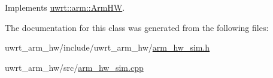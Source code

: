 Implements \hyperlink{classuwrt_1_1arm_1_1_arm_h_w_a934119487836109e24d9054f10e9832f}{uwrt\+::arm\+::\+Arm\+HW}.



The documentation for this class was generated from the following files\+:\begin{DoxyCompactItemize}
\item 
uwrt\+\_\+arm\+\_\+hw/include/uwrt\+\_\+arm\+\_\+hw/\hyperlink{arm__hw__sim_8h}{arm\+\_\+hw\+\_\+sim.\+h}\item 
uwrt\+\_\+arm\+\_\+hw/src/\hyperlink{arm__hw__sim_8cpp}{arm\+\_\+hw\+\_\+sim.\+cpp}\end{DoxyCompactItemize}
